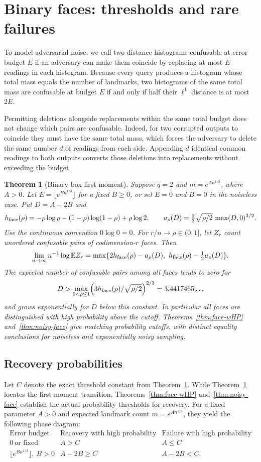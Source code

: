 \documentclass[11pt]{article}
\newtheorem{theorem}{Theorem}
\theoremstyle{definition}
\newcommand{\ex}{\mathbb E}
\newcommand{\whp}{with high probability}
\begin{document}
\section{Binary faces: thresholds and rare failures}
To model adversarial noise, we call two distance histograms confusable at error budget \(E\) if an adversary can make them coincide by replacing at most \(E\) readings in each histogram. Because every query produces a histogram whose total mass equals the number of landmarks, two histograms of the same total mass are confusable at budget \(E\) if and only if half their \(\ell^1\) distance is at most \(2E\).

Permitting deletions alongside replacements within the same total budget does not change which pairs are confusable. Indeed, for two corrupted outputs to coincide they must have the same total mass, which forces the adversary to delete the same number \(d\) of readings from each side. Appending \(d\) identical common readings to both outputs converts those deletions into replacements without exceeding the budget.

\begin{theorem}[Binary box first moment]\label{thm:box}
Suppose \(q=2\) and \(m=e^{A n^{1/3}}\), where \(A>0\). Let \(E=\lfloor e^{B n^{1/3}}\rfloor\) for a fixed \(B\ge0\), or set \(E=0\) and \(B=0\) in the noiseless case. Put \(D=A-2B\) and
\[
 h_{\rm face}(\rho)=-\rho\log\rho-(1-\rho)\log(1-\rho)+\rho\log2,
 \qquad
 a_\rho(D)=\tfrac23\sqrt{\rho/2}\,\max(D,0)^{3/2}.
\]
Use the continuous convention \(0\log 0=0\). For \(r/n\to\rho\in(0,1]\), let \(Z_r\) count unordered confusable pairs of codimension-\(r\) faces. Then
\[
\lim_{n\to\infty} n^{-1}\log\ex Z_r
=\max\{2h_{\rm face}(\rho)-a_\rho(D),\ h_{\rm face}(\rho)-\tfrac12a_\rho(D)\}.
\]
The expected number of confusable pairs among all faces tends to zero for
\[
D>\max_{0<\rho\le1}\Bigl(3h_{\rm face}(\rho)/\sqrt{\rho/2}\Bigr)^{2/3}=3.4417465\ldots
\]
and grows exponentially for \(D\) below this constant. In particular all faces are distinguished \whp{} above the cutoff. Theorems~\ref{thm:face-wHP} and~\ref{thm:noisy-face} give matching probability cutoffs, with distinct equality conclusions for noiseless and exponentially noisy sampling.
\end{theorem}

\subsection{Recovery probabilities}
Let \(C\) denote the exact threshold constant from Theorem~\ref{thm:box}. While Theorem~\ref{thm:box} locates the first-moment transition, Theorems~\ref{thm:face-wHP} and~\ref{thm:noisy-face} establish the actual probability thresholds for recovery. For a fixed parameter \(A>0\) and expected landmark count \(m=e^{An^{1/3}}\), they yield the following phase diagram:
\[
\begin{array}{c|c|c}
\text{Error budget} & \text{Recovery with high probability} &
                        \text{Failure with high probability} \\
\hline
0\ \text{or fixed} & A>C & A\le C \\
\lfloor e^{Bn^{1/3}}\rfloor,\ B>0 & A-2B\ge C & A-2B<C .
\end{array}
\]
\end{document}
